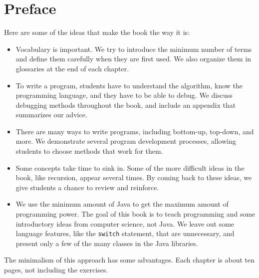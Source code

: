 \documentclass[12pt]{book}
\theoremstyle{exercise}
\begin{document}
\chapter{Preface}

Here are some of the ideas that make the book the way it is:

\begin{itemize}

\item Vocabulary is important.  
We try to introduce the minimum number of terms and define them carefully
when they are first used.
We also organize them in glossaries at the end of each chapter.

\item To write a program, students have to understand the
algorithm, know the programming language, and they have to be
able to debug.
We discuss debugging methods throughout the book, and include an appendix that summarizes our advice.

\item There are many ways to write programs, including bottom-up, top-down, and more.
We demonstrate several program development processes, allowing students to choose methods that work for them.

\item Some concepts take time to sink in.
Some of the more difficult ideas in the book, like recursion, appear several times.
By coming back to these ideas, we give students a chance to review and reinforce.

\item We use the minimum amount of Java to get the maximum amount of programming power.
The goal of this book is to teach programming and some introductory ideas from computer science, not Java.
We leave out some language features, like the {\tt switch} statement, that are unnecessary, and present only a few of the many classes in the Java libraries.

\end{itemize}

The minimalism of this approach has some advantages.
Each chapter is about ten pages, not including the exercises.

\end{document}
